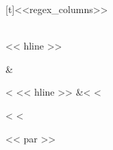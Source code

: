 \documentclass[letterpaper,10pt,english]{sphinxmanual}
\begin{document}
\begin{fulllineitems}
\begin{savenotes}
\begin{tabulary}{\linewidth}[t]{<<regex_columns>>}
\begin{varwidth}[t]{}
\end{varwidth}%
\\
<< hline >>\begin{varwidth}[t]{}
\sphinxstyletheadfamily {}
\sphinxbeforeendvarwidth
\end{varwidth}%
&\begin{varwidth}[t]{}<%
<< hline >>\sphinxstyletheadfamily
{}
&<%
<%
\end{varwidth}%
<%
<%
\end{tabulary}
<< par >>
\sphinxattableend\end{savenotes}

\end{fulllineitems}

\end{document}
